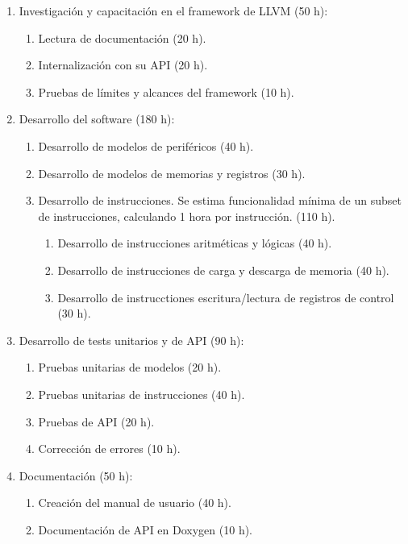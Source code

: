 \begin{enumerate}
\item Investigación y capacitación en el framework de LLVM (50 h):

  \begin{enumerate}
  \item Lectura de documentación (20 h).
  \item Internalización con su API (20 h).
  \item Pruebas de límites y alcances del framework (10 h).
  \end{enumerate}

\item Desarrollo del software (180 h):

  \begin{enumerate}
  \item Desarrollo de modelos de periféricos (40 h).
  \item Desarrollo de modelos de memorias y registros (30 h).
  \item Desarrollo de instrucciones. Se estima funcionalidad mínima de un subset de instrucciones, calculando 1 hora por instrucción. (110 h).
    \begin{enumerate}
    \item Desarrollo de instrucciones aritméticas y lógicas (40 h).
    \item Desarrollo de instrucciones de carga y descarga de memoria (40 h).
    \item Desarrollo de instrucctiones escritura/lectura de registros de control (30 h).
    \end{enumerate}
  \end{enumerate}

\item Desarrollo de tests unitarios y de API (90 h):

  \begin{enumerate}
  \item Pruebas unitarias de modelos (20 h).
  \item Pruebas unitarias de instrucciones (40 h).
  \item Pruebas de API (20 h).
  \item Corrección de errores (10 h).
  \end{enumerate}

\item Documentación (50 h):

  \begin{enumerate}
  \item Creación del manual de usuario (40 h).
  \item Documentación de API en Doxygen (10 h).
  \end{enumerate}


\end{enumerate}
